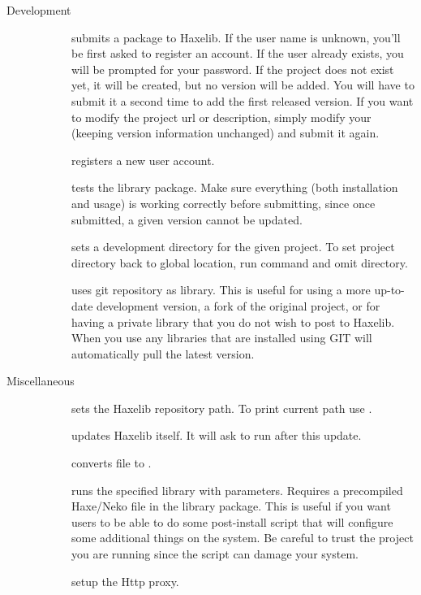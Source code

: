 \begin{description}
	\item[Development]
		\begin{description}
			\item[] submits a package to Haxelib. If the user name is unknown, you'll be first asked to register an account. If the user already exists, you will be prompted for your password. If the project does not exist yet, it will be created, but no version will be added. You will have to submit it a second time to add the first released version. If you want to modify the project url or description, simply modify your  (keeping version information unchanged) and submit it again.
			\item[] registers a new user account.
			\item[] tests the library package. Make sure everything (both installation and usage) is working correctly before submitting, since once submitted, a given version cannot be updated.
			\item[] sets a development directory for the given project. To set project directory back to global location, run command and omit directory.
			\item[] uses git repository as library. This is useful for using a more up-to-date development version, a fork of the original project, or for having a private library that you do not wish to post to Haxelib. When you use  any libraries that are installed using GIT will automatically pull the latest version.
		\end{description}
		
	\item[Miscellaneous]
		\begin{description}
			\item[] sets the Haxelib repository path. To print current path use .
			\item[] updates Haxelib itself. It will ask to run  after this update.
			\item[] converts  file to .
			\item[] runs the specified library with parameters. Requires  a precompiled Haxe/Neko  file in the library package. This is useful if you want users to be able to do some post-install script that will configure some additional things on the system. Be careful to trust the project you are running since the script can damage your system.
			\item[] setup the Http proxy.
		\end{description}
\end{description}
